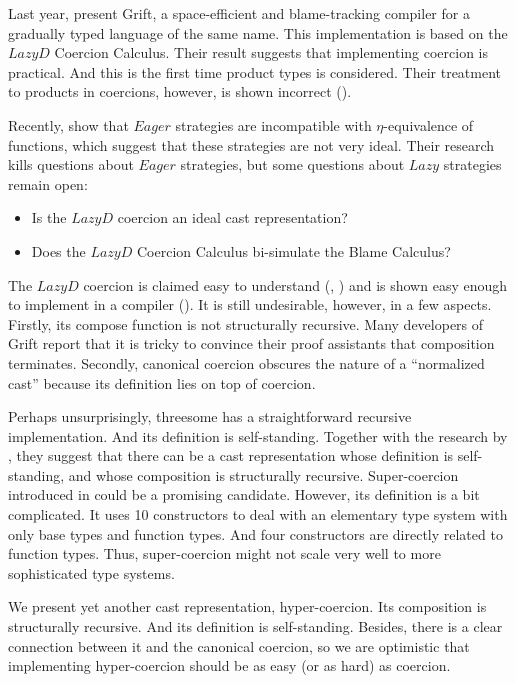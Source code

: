 \documentclass[acmsmall,review,anonymous]{acmart}\settopmatter{printfolios=true,printccs=false,printacmref=false}
\begin{document}
Last year, \citet{kuhlenschmidt2018efficient} present Grift, a space-efficient 
and blame-tracking compiler for a gradually typed language of the same name. 
This implementation is based on the $ Lazy D $ Coercion Calculus.
Their result suggests that implementing coercion is practical. And this is the 
first time product types is considered. Their treatment to products in 
coercions, however, is shown incorrect (\citet{Gradual-TypingType-based-casts}).

Recently, \citet{new2019gradual} show that $ Eager $ strategies are 
incompatible with $\eta$-equivalence of functions, which suggest that these 
strategies are not very ideal. Their research kills questions about $ Eager $ 
strategies, but some questions about $ Lazy $ strategies remain open:

\begin{itemize}
	\item Is the $ Lazy D $ coercion an ideal cast representation?
	\item Does the $ Lazy D $ Coercion Calculus bi-simulate the Blame Calculus?
\end{itemize}

The $ Lazy D $ coercion is claimed easy to understand 
(\cite{garcia2013calculating}, \cite{siek2015blame}) and is shown 
easy enough to implement in a compiler (\cite{kuhlenschmidt2018efficient}).
It is still undesirable, however, in a 
few aspects. Firstly, its compose function is not structurally recursive. Many 
developers of Grift report that it is tricky to convince their 
proof assistants that composition terminates. Secondly, canonical coercion
obscures the nature of a ``normalized cast'' because its definition lies on 
top of coercion. 

Perhaps unsurprisingly, threesome has a straightforward recursive 
implementation. And its definition is self-standing. Together with the research 
by \citet{garcia2013calculating}, they suggest that there can be a cast 
representation whose definition is self-standing, and whose composition is 
structurally recursive. Super-coercion introduced in 
\citet{garcia2013calculating} could 
be a promising candidate. However, its definition is a bit complicated. It uses 
10 constructors to deal with an elementary type system with only base types and 
function types. And four constructors are directly related to 
function types. Thus, super-coercion might not scale very well to more 
sophisticated type systems.

We present yet another cast representation, hyper-coercion. Its 
composition is structurally recursive. And its definition is self-standing. 
Besides, there is a clear connection between it and the canonical coercion, 
so we are optimistic that implementing hyper-coercion should be as easy (or 
as hard) as coercion.
\end{document}
